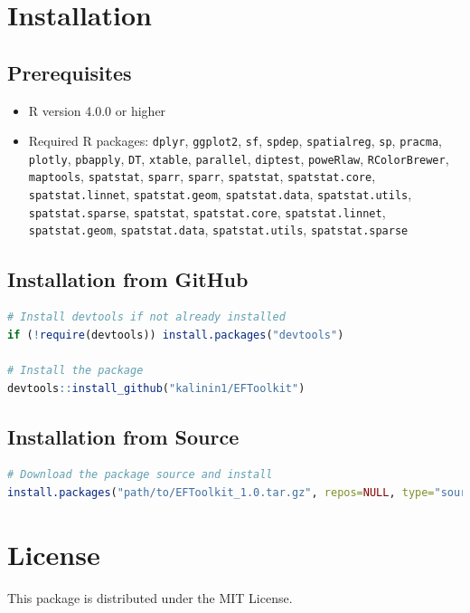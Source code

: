 \documentclass{article}
\begin{document}
\section{Installation}

\subsection{Prerequisites}
\begin{itemize}
    \item R version 4.0.0 or higher
    \item Required R packages: \texttt{dplyr}, \texttt{ggplot2}, \texttt{sf}, \texttt{spdep}, \texttt{spatialreg}, \texttt{sp}, \texttt{pracma}, \texttt{plotly}, \texttt{pbapply}, \texttt{DT}, \texttt{xtable}, \texttt{parallel}, \texttt{diptest}, \texttt{poweRlaw}, \texttt{RColorBrewer}, \texttt{maptools}, \texttt{spatstat}, \texttt{sparr}, \texttt{sparr}, \texttt{spatstat}, \texttt{spatstat.core}, \texttt{spatstat.linnet}, \texttt{spatstat.geom}, \texttt{spatstat.data}, \texttt{spatstat.utils}, \texttt{spatstat.sparse}, \texttt{spatstat}, \texttt{spatstat.core}, \texttt{spatstat.linnet}, \texttt{spatstat.geom}, \texttt{spatstat.data}, \texttt{spatstat.utils}, \texttt{spatstat.sparse}
\end{itemize}

\subsection{Installation from GitHub}
\begin{lstlisting}[language=R]
# Install devtools if not already installed
if (!require(devtools)) install.packages("devtools")

# Install the package
devtools::install_github("kalinin1/EFToolkit")
\end{lstlisting}

\subsection{Installation from Source}
\begin{lstlisting}[language=R]
# Download the package source and install
install.packages("path/to/EFToolkit_1.0.tar.gz", repos=NULL, type="source")
\end{lstlisting}

\section{License}
This package is distributed under the MIT License.
\end{document}
